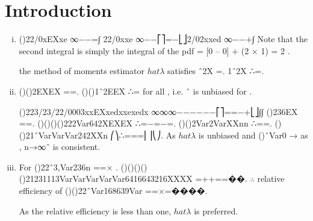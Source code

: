 \documentclass{article}
\author{kobriendublin }
\date{December 2018}
\begin{document}
\section*{Introduction}
\begin{enumerate}[(i)]
\item 
()22/0xEXxe \lambda  \lambda ∞−−=∫
22/0xxe \lambda  \lambda  \lambda ∞−−⎡⎤=−⎣⎦2/02xxed \lambda  \lambda  \lambda ∞−−+∫
Note that the second integral is simply the integral of the pdf
= [0 – 0] + (2 \lambda  × 1) = 2 \lambda .

\therefore the method of moments estimator $hat{ \lambda}$  satisfies ˆ2X \lambda =. 1ˆ2X \lambda ∴=.
\item  ()()2EXEX \lambda ==.
()()1ˆ2EEX \lambda  \lambda ∴= for all  \lambda , i.e. ˆ \lambda  is unbiased for  \lambda .

()223/23/22/0003xxEXxedxxexedx \lambda  \lambda  \lambda  \lambda  \lambda  \lambda  \lambda ∞∞∞−−−−−−⎡⎤==−+⎣⎦∫∫
()236EX \lambda  \lambda ==.
()()()()222Var642XEXEX  \lambda  \lambda  \lambda ∴=−=−=. ()()2Var2VarXXnn \lambda ∴==.
()()21ˆVarVarVar242XXn \lambda  \lambda ⎛⎞∴===⎜⎟⎝⎠.
\smallskip
As $hat{ \lambda}$   is unbiased and ()ˆVar0 \lambda → as , n→∞ˆ \lambda  is consistent.
\item For ()22ˆ3,Var236n \lambda  \lambda  \lambda ==× .
()()()()()21231113VarVarVarVarVar6416643216XXXX  \lambda  \lambda =++==��.
$\therefore$ relative efficiency of ()()22ˆVar168639Var \lambda  \lambda  \lambda  \lambda  \lambda ==×=����.

As the relative efficiency is less than one, $hat{ \lambda}$  is preferred.
\end{enumerate}
\end{document}
